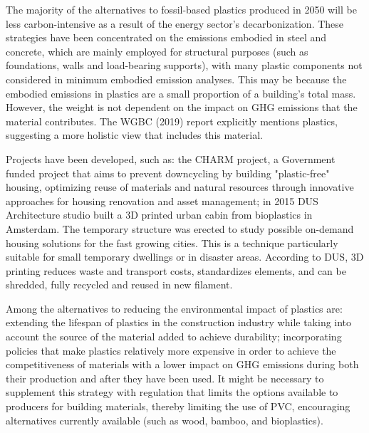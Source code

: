 The majority of the alternatives to fossil-based plastics produced in 2050 will be less carbon-intensive as a result of the energy sector's decarbonization.\autocite{pickard2020phasing} These strategies have been concentrated on the emissions embodied in steel and concrete, which are mainly employed for structural purposes (such as foundations, walls and load-bearing supports), with many plastic components not considered in minimum embodied emission analyses.\autocite{elkerbout2021impact} This may be because the embodied emissions in plastics are a small proportion of a building’s total mass. However, the weight is not dependent on the impact on GHG emissions that the material contributes. The WGBC (2019) report\autocite{world2019worldgbc} explicitly mentions plastics, suggesting a more holistic view that includes this material. 

Projects have been developed, such as: the CHARM project, a Government funded project that aims to prevent downcycling by building "plastic-free" housing, optimizing reuse of materials and natural resources through innovative approaches for housing renovation and asset management;\autocite{asbp_2020} in 2015 DUS Architecture studio built a 3D printed urban cabin from bioplastics in Amsterdam. The temporary structure was erected to study possible on-demand housing solutions for the fast growing cities. This is a technique particularly suitable for small temporary dwellings or in disaster areas. According to DUS, 3D printing reduces waste and transport costs, standardizes elements, and can be shredded, fully recycled and reused in new filament.\autocite{lanko2017additive} 

Among the alternatives to reducing the environmental impact of plastics are: extending the lifespan of plastics in the construction industry while taking into account the source of the material added to achieve durability; incorporating policies that make plastics relatively more expensive in order to achieve the competitiveness of materials with a lower impact on GHG emissions during both their production and after they have been used. It might be necessary to supplement this strategy with regulation that limits the options available to producers for building materials, thereby limiting the use of PVC, encouraging alternatives currently available (such as wood, bamboo, and bioplastics). 



